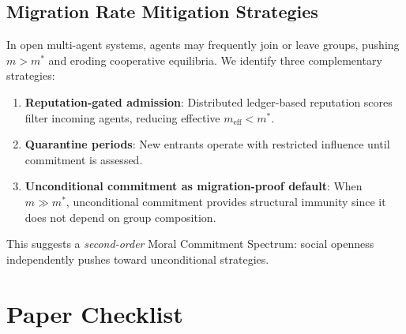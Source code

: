 \documentclass{article}
\begin{document}
\subsection{Migration Rate Mitigation Strategies}
\label{app:migration}

In open multi-agent systems, agents may frequently join or leave groups, pushing $m > m^*$ and eroding cooperative equilibria. We identify three complementary strategies:
\begin{enumerate}
    \item \textbf{Reputation-gated admission}: Distributed ledger-based reputation scores~\citep{anastassacos2020cooperation} filter incoming agents, reducing effective $m_{\text{eff}} < m^*$.
    \item \textbf{Quarantine periods}: New entrants operate with restricted influence until commitment is assessed.
    \item \textbf{Unconditional commitment as migration-proof default}: When $m \gg m^*$, unconditional commitment provides structural immunity since it does not depend on group composition.
\end{enumerate}
This suggests a \emph{second-order} Moral Commitment Spectrum: social openness independently pushes toward unconditional strategies.

\section*{Paper Checklist}
\end{document}
